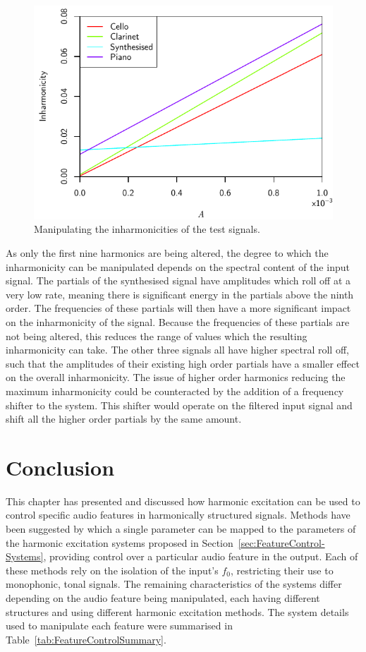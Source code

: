 		\begin{figure}[h!]
			\centering
			\includegraphics{chapter6/Images/MoveInharmonicities.pdf}
			\caption{Manipulating the inharmonicities of the test signals.}
			\label{fig:MoveInharmonicities}
		\end{figure}

		As only the first nine harmonics are being altered, the degree to which the inharmonicity can be
		manipulated depends on the spectral content of the input signal. The partials of the synthesised signal
		have amplitudes which roll off at a very low rate, meaning there is significant energy in the partials
		above the ninth order. The frequencies of these partials will then have a more significant impact on the
		inharmonicity of the signal. Because the frequencies of these partials are not being altered, this reduces
		the range of values which the resulting inharmonicity can take. The other three signals all have higher
		spectral roll off, such that the amplitudes of their existing high order partials have a smaller effect on
		the overall inharmonicity. The issue of higher order harmonics reducing the maximum inharmonicity could be
		counteracted by the addition of a frequency shifter to the system. This shifter would operate on the
		filtered input signal and shift all the higher order partials by the same amount.

\section{Conclusion}
\label{sec:FeatureControl-Conclusions}
	This chapter has presented and discussed how harmonic excitation can be used to control specific audio features in
	harmonically structured signals. Methods have been suggested by which a single parameter can be mapped to the
	parameters of the harmonic excitation systems proposed in Section~\ref{sec:FeatureControl-Systems}, providing
	control over a particular audio feature in the output. Each of these methods rely on the isolation of the input's
	$f_{0}$, restricting their use to monophonic, tonal signals. The remaining characteristics of the systems differ
	depending on the audio feature being manipulated, each having different structures and using different harmonic
	excitation methods. The system details used to manipulate each feature were summarised in
	Table~\ref{tab:FeatureControlSummary}.

